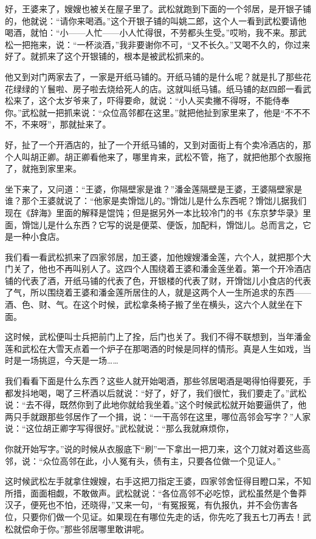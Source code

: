 \par 好，王婆来了，嫂嫂也被关在屋子里了。武松就跑到下面的一个邻居，是开银子铺的，他就说：“请你来喝酒。”这个开银子铺的叫姚二郎，这个人一看到武松要请他喝酒，就怕：“小——人忙——小人忙得很，不劳都头生受。”哎哟，我不来。那武松一把拖来，说：“一杯淡酒，”我非要谢你不可，“又不长久。”又喝不久的，你过来好了。就抓来了这个开银铺的，根本是被武松抓来的。
\par 他又到对门两家去了，一家是开纸马铺的。开纸马铺的是什么呢？就是扎了那些花花绿绿的丫鬟啦、房子啦去烧给死人的店。这就叫纸马铺。纸马铺的赵四郎一看武松来了，这个太岁爷来了，吓得要命，就说：“小人买卖撇不得呀，不能侍奉你。”武松就一把抓来说：“众位高邻都在这里。”就把他扯到家里来了，他是“不不不不，不来呀”，那就扯来了。
\par 好，扯了一个开酒店的，扯了一个开纸马铺的，又到对面街上有个卖冷酒店的，那个人叫胡正卿。胡正卿看他来了，哪里肯来，武松不管，拖了，就把他那个衣服拖了，就拖到家里来。
\par 坐下来了，又问道：“王婆，你隔壁家是谁？”潘金莲隔壁是王婆，王婆隔壁家是谁？那个王婆就说了：“他家是卖馉饳儿的。”馉饳儿是什么东西呢？馉饳儿据我们现在《辞海》里面的解释是馄饨；但是据另外一本比较冷门的书《东京梦华录》里面，馉饳儿是什么东西？它写的说是便菜、便饭，加配料，馉饳儿。总而言之，它是一种小食店。
\par 我们看一看武松抓来了四家邻居，加王婆，加他嫂嫂潘金莲，六个人，就把那个大门关了，他也不再叫别人了。这四个人围绕着王婆和潘金莲坐着。第一个开冷酒店铺的代表了酒，开纸马铺的代表了色，开银楼的代表了财，开馉饳儿小食店的代表了气，所以围绕着王婆和潘金莲所居住的人，就是这两个人一生所追求的东西——酒、色、财、气。在这个时候，武松拿条椅子搬了坐在横头，这六个人就坐在下面。
\par 这时候，武松便叫士兵把前门上了拴，后门也关了。我们不得不联想到，当年潘金莲和武松在大雪天点着一个炉子在那喝酒的时候是同样的情形。真是人生如戏，当时是一场挑逗，今天是一场……
\par 我们看看下面是什么东西？这些人就开始喝酒，那些邻居喝酒是喝得怕得要死，手都发抖地喝，喝了三杯酒以后就说：“好了，好了，我们很忙，我们要走了。”武松说：“去不得，既然你到了此地你就给我坐着。”这个时候武松就开始要逼供了，他两只手就跟那些邻居作了一个揖，说：“一干高邻在这里，哪位高邻会写字？”人家说：“这位胡正卿字写得很好。”武松就说：“那么我就麻烦你，
\par 你就开始写字。”说的时候从衣服底下“刷”一下拿出一把刀来，这个刀就对着这些高邻，说：“众位高邻在此，小人冤有头，债有主，只要各位做一个见证人。”
\par 这时候武松左手就拿住嫂嫂，右手这把刀指定王婆，四家邻舍怔得目瞪口呆，不知所措，面面相觑，不敢做声。武松就说：“各位高邻不必吃惊，武松虽然是个鲁莽汉子，便死也不怕，还晓得，”又来一句，“有冤报冤，有仇报仇，并不会伤害各位，只要你们做一个见证。如果现在有哪位先走的话，你先吃了我五七刀再去！武松就偿命于你。”那些邻居哪里敢讲呢。
